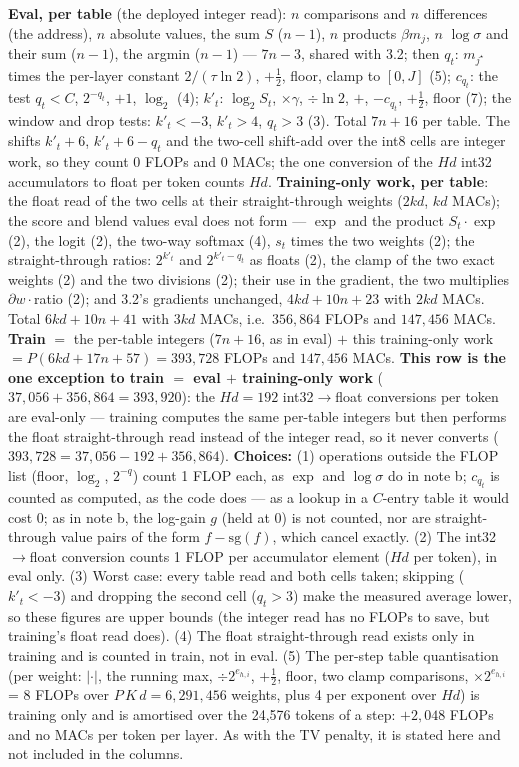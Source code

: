 \documentclass[10pt]{article}
\begin{document}
\begin{itemize}
  \textbf{Eval, per table} (the deployed integer read): $n$ comparisons and $n$ differences (the address), $n$ absolute values, the sum $S$ ($n-1$), $n$ products $\beta m_j$, $n$ $\log\sigma$ and their sum ($n-1$), the argmin ($n-1$) --- $7n-3$, shared with 3.2;
  then $q_t$: $m_{j^\star}$ times the per-layer constant $2/(\tau\ln2)$, $+\tfrac12$, floor, clamp to $[0,J]$ (5); $c_{q_t}$: the test $q_t<C$, $2^{-q_t}$, $+1$, $\log_2$ (4); $k'_t$: $\log_2S_t$, $\times\gamma$, $\div\ln2$, $+$, $-c_{q_t}$, $+\tfrac12$, floor (7);
  the window and drop tests: $k'_t<-3$, $k'_t>4$, $q_t>3$ (3). Total $7n+16$ per table.
  The shifts $k'_t+6$, $k'_t+6-q_t$ and the two-cell shift-add over the int8 cells are integer work, so they count 0 FLOPs and 0 MACs; the one conversion of the $Hd$ int32 accumulators to float per token counts $Hd$.
  \textbf{Training-only work, per table}: the float read of the two cells at their straight-through weights ($2kd$, $kd$ MACs); the score and blend values eval does not form --- $\exp$ and the product $S_t\cdot\exp$ (2), the logit (2), the two-way softmax (4), $s_t$ times the two weights (2);
  the straight-through ratios: $2^{k'_t}$ and $2^{k'_t-q_t}$ as floats (2), the clamp of the two exact weights (2) and the two divisions (2); their use in the gradient, the two multiplies $\partial w\cdot$ratio (2);
  and 3.2's gradients unchanged, $4kd+10n+23$ with $2kd$ MACs. Total $6kd+10n+41$ with $3kd$ MACs, i.e.\ $356{,}864$ FLOPs and $147{,}456$ MACs.
  \textbf{Train} $=$ the per-table integers ($7n+16$, as in eval) $+$ this training-only work $=P(6kd+17n+57)=393{,}728$ FLOPs and $147{,}456$ MACs.
  \textbf{This row is the one exception to train $=$ eval $+$ training-only work} ($37{,}056+356{,}864=393{,}920$): the $Hd=192$ int32$\to$float conversions per token are eval-only ---
  training computes the same per-table integers but then performs the float straight-through read instead of the integer read, so it never converts ($393{,}728=37{,}056-192+356{,}864$).
  \textbf{Choices:} (1) operations outside the FLOP list (floor, $\log_2$, $2^{-q}$) count 1 FLOP each, as $\exp$ and $\log\sigma$ do in note b; $c_{q_t}$ is counted as computed, as the code does --- as a lookup in a $C$-entry table it would cost 0;
  as in note b, the log-gain $g$ (held at 0) is not counted, nor are straight-through value pairs of the form $f-\mathrm{sg}(f)$, which cancel exactly.
  (2) The int32$\to$float conversion counts 1 FLOP per accumulator element ($Hd$ per token), in eval only.
  (3) Worst case: every table read and both cells taken; skipping ($k'_t<-3$) and dropping the second cell ($q_t>3$) make the measured average lower, so these figures are upper bounds (the integer read has no FLOPs to save, but training's float read does).
  (4) The float straight-through read exists only in training and is counted in train, not in eval.
  (5) The per-step table quantisation (per weight: $|\cdot|$, the running max, $\div2^{e_{h,i}}$, $+\tfrac12$, floor, two clamp comparisons, $\times2^{e_{h,i}}$ = 8 FLOPs over $P\,K\,d=6{,}291{,}456$ weights, plus 4 per exponent over $Hd$)
  is training only and is amortised over the 24,576 tokens of a step: $+2{,}048$ FLOPs and no MACs per token per layer. As with the TV penalty, it is stated here and not included in the columns.
\end{itemize}
\end{document}
